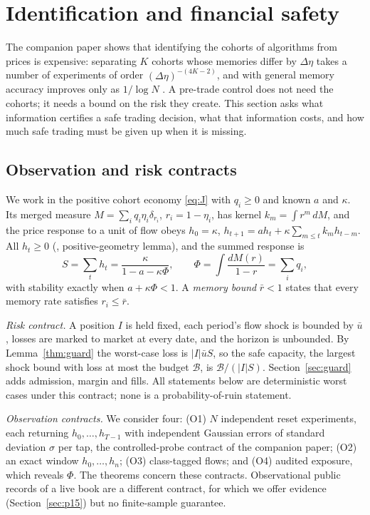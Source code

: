 \section{Identification and financial safety}\label{sec:infosafety}

The companion paper shows that identifying the cohorts of algorithms from prices is expensive: separating $K$ cohorts whose memories differ by $\Delta\eta$ takes a number of experiments of order $(\Delta\eta)^{-(4K-2)}$, and with general memory accuracy improves only as $1/\log N$ \citep{niroula2026}. A pre-trade control does not need the cohorts; it needs a bound on the risk they create. This section asks what information certifies a safe trading decision, what that information costs, and how much safe trading must be given up when it is missing.

\subsection{Observation and risk contracts}\label{sec:contracts}
We work in the positive cohort economy \eqref{eq:J} with $q_i\ge0$ and known $a$ and $\kappa$. Its merged measure $M=\sum_iq_i\eta_i\delta_{r_i}$, $r_i=1-\eta_i$, has kernel $k_m=\int r^m\,dM$, and the price response to a unit of flow obeys $h_0=\kappa$, $h_{t+1}=ah_t+\kappa\sum_{m\le t}k_mh_{t-m}$. All $h_t\ge0$ (\citealp{niroula2026}, positive-geometry lemma), and the summed response is
\begin{equation}\label{eq:SPhi}
S=\sum_th_t=\frac{\kappa}{1-a-\kappa\Phi},\qquad \Phi=\int\frac{dM(r)}{1-r}=\sum_iq_i ,
\end{equation}
with stability exactly when $a+\kappa\Phi<1$. A \emph{memory bound} $\bar r<1$ states that every memory rate satisfies $r_i\le\bar r$.

\emph{Risk contract.} A position $I$ is held fixed, each period's flow shock is bounded by $\bar u$, losses are marked to market at every date, and the horizon is unbounded. By Lemma~\ref{thm:guard} the worst-case loss is $|I|\bar uS$, so the safe capacity, the largest shock bound with loss at most the budget $\mathcal B$, is $\mathcal B/(|I|S)$. Section~\ref{sec:guard} adds admission, margin and fills. All statements below are deterministic worst cases under this contract; none is a probability-of-ruin statement.

\emph{Observation contracts.} We consider four: (O1) $N$ independent reset experiments, each returning $h_0,\ldots,h_{T-1}$ with independent Gaussian errors of standard deviation $\sigma$ per tap, the controlled-probe contract of the companion paper; (O2) an exact window $h_0,\ldots,h_n$; (O3) class-tagged flows; and (O4) audited exposure, which reveals $\Phi$. The theorems concern these contracts. Observational public records of a live book are a different contract, for which we offer evidence (Section~\ref{sec:p15}) but no finite-sample guarantee.

